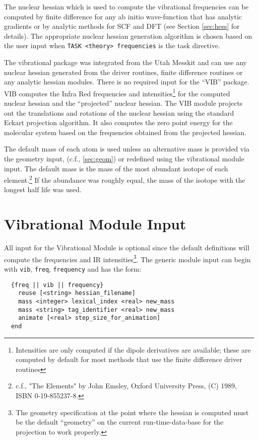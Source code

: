 \label{sec:vib}

The nuclear hessian which is used to compute the vibrational
frequencies can be computed by finite difference for any ab initio
wave-function that has analytic gradients or by analytic methods
for SCF and DFT (see Section \ref{sec:hess} for details).  The appropriate
nuclear hessian generation algorithm is chosen based on the user input
when \verb+TASK <theory> frequencies+ is the task directive.

The vibrational package was integrated from the Utah Messkit and can
use any nuclear hessian generated from the driver routines, finite
difference routines or any analytic hessian modules.  There is no required
input for the ``VIB'' package.  VIB computes the Infra Red frequencies
and intensities\footnote{Intensities are only computed if the dipole
derivatives are available; these are computed by default for most
methods that use the finite difference driver routines} for the
computed nuclear hessian and the ``projected'' nuclear hessian.  The
VIB module projects out the translations and rotations of the nuclear
hessian using the standard Eckart projection algorithm.  
It also computes the zero point energy for the molecular system
based on the frequencies obtained from the projected hessian.

The default mass of each atom is used unless an alternative mass is
provided via the geometry input, (c.f., \ref{sec:geom}) or redefined
using the vibrational module input.  The default mass is the mass of
the most abundant isotope of each element.\footnote{c.f., "The
Elements" by John Emsley, Oxford University Press, (C) 1989, ISBN
0-19-855237-8.} If the abundance was roughly equal, the mass of the
isotope with the longest half life was used.

\section{Vibrational Module Input}

All input for the Vibrational Module is optional since the default
definitions will compute the frequencies and IR
intensities\footnote{The geometry specification at the point where the
hessian is computed must be the default ``geometry'' on the current
run-time-data-base for the projection to work properly.}.  The generic
module input can begin with \verb+vib+, \verb+freq+, \verb+frequency+
and has the form:
\begin{verbatim}
  {freq || vib || frequency}
    reuse [<string> hessian_filename]
    mass <integer> lexical_index <real> new_mass
    mass <string> tag_identifier <real> new_mass
    animate [<real> step_size_for_animation]     
  end
\end{verbatim}


